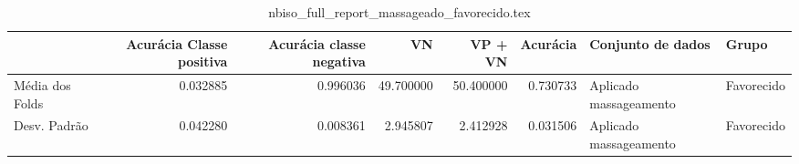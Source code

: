 \begin{table}
\centering
\caption{nbiso_full_report_massageado_favorecido.tex}
\label{nbiso_full_report_massageado_favorecido.tex}
\begin{tabular}{lrrrrrll}
\toprule
{} &  Acurácia Classe positiva &  Acurácia classe negativa &        VN  &   VP + VN  &  Acurácia &       Conjunto de dados &       Grupo \\
\midrule
Média dos Folds &                  0.032885 &                  0.996036 &  49.700000 &  50.400000 &  0.730733 &  Aplicado massageamento &  Favorecido \\
Desv. Padrão    &                  0.042280 &                  0.008361 &   2.945807 &   2.412928 &  0.031506 &  Aplicado massageamento &  Favorecido \\
\bottomrule
\end{tabular}
\end{table}
